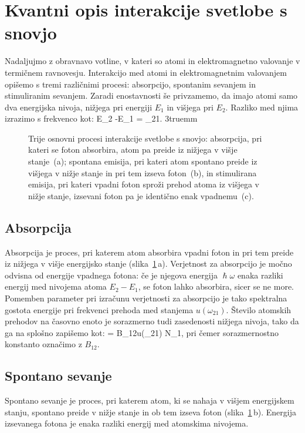 \section{Kvantni opis interakcije svetlobe s snovjo}
Nadaljujmo z obravnavo votline, v kateri so atomi 
in elektromagnetno valovanje v termičnem ravnovesju. 
Interakcijo med atomi in elektromagnetnim valovanjem 
opišemo s tremi različnimi procesi: absorpcijo, spontanim
sevanjem in stimuliranim sevanjem. Zaradi enostavnosti še
privzamemo, da imajo atomi samo dva energijska nivoja, nižjega pri energiji
$E_1$ in višjega pri $E_2$. Razliko med njima izrazimo s frekvenco kot:
\beq
E_2 -E_1 = \hslash \omega_{21}.
\label{eq:11_07}
\eeq
\vglue3truemm
\begin{figure}[h!]
\centering
\def\svgwidth{140truemm} 

\caption{Trije osnovni procesi interakcije svetlobe s snovjo:
absorpcija, pri kateri se foton absorbira, atom pa preide iz nižjega 
v višje stanje~(a); spontana emisija, pri kateri atom spontano preide 
iz višjega v nižje stanje in pri tem izseva foton~(b), in stimulirana 
emisija, pri kateri vpadni foton sproži prehod
atoma iz višjega v nižje stanje, izsevani foton pa je identično enak vpadnemu~(c).
}
\label{fig:11_procesi}
\end{figure}

\subsection*{Absorpcija} 
Absorpcija je proces, pri katerem atom absorbira vpadni foton in pri tem 
preide iz nižjega v višje energijsko stanje (slika~\ref{fig:11_procesi}\,a). 
Verjetnost za absorpcijo je močno odvisna od energije vpadnega fotona: če je 
njegova energija $\hslash \omega$ enaka razliki energij med nivojema atoma $E_2-E_1$, 
se foton lahko absorbira, sicer se ne more. Pomemben parameter pri izračunu 
verjetnosti za absorpcijo je tako spektralna gostota energije 
pri frekvenci prehoda med stanjema $u(\omega_{21})$. 
Število atomskih prehodov na časovno enoto je sorazmerno tudi zasedenosti
nižjega nivoja, tako da ga na splošno zapišemo kot:
\beq
{} = B_{12}u(\omega_{21}) N_1,
\label{eq:11_08}
\eeq
pri čemer sorazmernostno konstanto označimo z $B_{12}$. 

\subsection*{Spontano sevanje}
Spontano sevanje je proces, pri katerem atom, 
ki se nahaja v višjem energijskem stanju, spontano preide v nižje 
stanje in ob tem izseva foton (slika~\ref{fig:11_procesi}\,b). Energija
izsevanega fotona je enaka razliki energij med atomskima nivojema.

